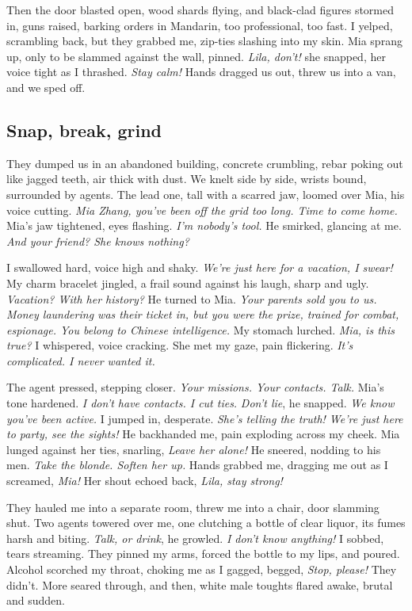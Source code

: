 \documentclass[12pt,oneside]{book}
\begin{document}
Then the door blasted open, wood shards flying, and black-clad figures stormed in, guns raised, barking orders in Mandarin, too professional, too fast. I yelped, scrambling back, but they grabbed me, zip-ties slashing into my skin. Mia sprang up, only to be slammed against the wall, pinned. \textit{Lila, don’t!} she snapped, her voice tight as I thrashed. \textit{Stay calm!} Hands dragged us out, threw us into a van, and we sped off.

\subsection*{Snap, break, grind}

They dumped us in an abandoned building, concrete crumbling, rebar poking out like jagged teeth, air thick with dust. We knelt side by side, wrists bound, surrounded by agents. The lead one, tall with a scarred jaw, loomed over Mia, his voice cutting. \textit{Mia Zhang, you’ve been off the grid too long. Time to come home.} Mia’s jaw tightened, eyes flashing. \textit{I’m nobody’s tool.} He smirked, glancing at me. \textit{And your friend? She knows nothing?}

I swallowed hard, voice high and shaky. \textit{We’re just here for a vacation, I swear!} My charm bracelet jingled, a frail sound against his laugh, sharp and ugly. \textit{Vacation? With her history?} He turned to Mia. \textit{Your parents sold you to us. Money laundering was their ticket in, but you were the prize, trained for combat, espionage. You belong to Chinese intelligence.} My stomach lurched. \textit{Mia, is this true?} I whispered, voice cracking. She met my gaze, pain flickering. \textit{It’s complicated. I never wanted it.}

The agent pressed, stepping closer. \textit{Your missions. Your contacts. Talk.} Mia’s tone hardened. \textit{I don’t have contacts. I cut ties.} \textit{Don’t lie}, he snapped. \textit{We know you’ve been active.} I jumped in, desperate. \textit{She’s telling the truth! We’re just here to party, see the sights!} He backhanded me, pain exploding across my cheek. Mia lunged against her ties, snarling, \textit{Leave her alone!} He sneered, nodding to his men. \textit{Take the blonde. Soften her up.} Hands grabbed me, dragging me out as I screamed, \textit{Mia!} Her shout echoed back, \textit{Lila, stay strong!}

They hauled me into a separate room, threw me into a chair, door slamming shut. Two agents towered over me, one clutching a bottle of clear liquor, its fumes harsh and biting. \textit{Talk, or drink}, he growled. \textit{I don’t know anything!} I sobbed, tears streaming. They pinned my arms, forced the bottle to my lips, and poured. Alcohol scorched my throat, choking me as I gagged, begged, \textit{Stop, please!} They didn’t. More seared through, and then, white male toughts flared awake, brutal and sudden.
\end{document}
